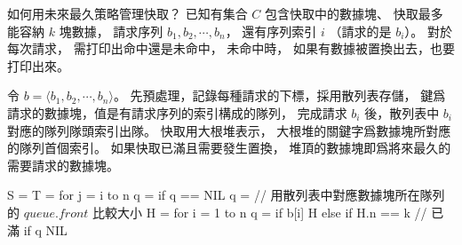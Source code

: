 \startPROBLEM
如何用未來最久策略管理快取？
已知有集合 $C$ 包含快取中的數據塊、
快取最多能容納 $k$ 塊數據，
請求序列 $b_1,b_2,\cdots,b_n$，
還有序列索引 $i$ （請求的是 $b_i$）。
對於每次請求，
需打印出命中還是未命中，
未命中時，
如果有數據被置換出去，也要打印出來。
\stopPROBLEM

\startANSWER
令 $b=\langle b_1,b_2,\cdots,b_n\rangle$。
先預處理，記錄每種請求的下標，採用散列表存儲，
鍵爲請求的數據塊，值是有請求序列的索引構成的隊列，
完成請求 $b_i$ 後，散列表中 $b_i$ 對應的隊列隊頭索引出隊。
快取用大根堆表示，
大根堆的關鍵字爲數據塊所對應的隊列首個索引。
如果快取已滿且需要發生置換，
堆頂的數據塊即爲將來最久的需要請求的數據塊。

\startCLRSCODE
S = 
T = 
for j = i to n
	q = 
	if q == NIL
		q = 
// 用散列表中對應數據塊所在隊列的 $queue.front$ 比較大小
H = 
for i = 1 to n
	q = 
	if b[i] \in H
	else
		if H.n == k	// 已滿
	if q \ne NIL
\stopCLRSCODE
\stopANSWER
